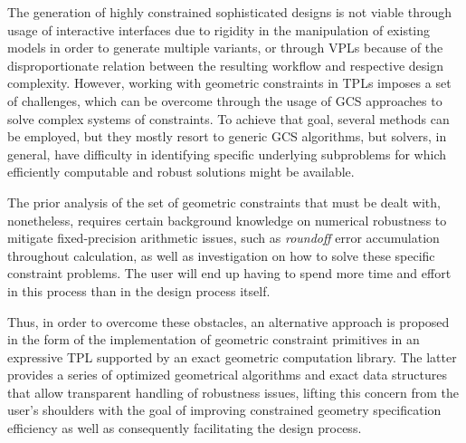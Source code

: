 %
\label{chap:conclusion}
\cleardoublepage{}


\noindent
The generation of highly constrained sophisticated designs is not viable through
usage of interactive interfaces due to rigidity in the manipulation of existing
models in order to generate multiple variants, or through \acp{VPL} because of
the disproportionate relation between the resulting workflow and respective
design complexity.  However, working with geometric constraints in \acp{TPL}
imposes a set of challenges, which can be overcome through the usage of \ac{GCS}
approaches to solve complex systems of constraints.  To achieve that goal,
several methods can be employed, but they mostly resort to generic \acs{GCS}
algorithms, but solvers, in general, have difficulty in identifying specific
underlying subproblems for which efficiently computable and robust solutions
might be available.

The prior analysis of the set of geometric constraints that must be dealt with,
nonetheless, requires certain background knowledge on numerical robustness to
mitigate fixed-precision arithmetic issues, such as \textit{roundoff} error
accumulation throughout calculation, as well as investigation on how to solve
these specific constraint problems.  The user will end up having to spend more
time and effort in this process than in the design process itself.

Thus, in order to overcome these obstacles, an alternative approach is proposed
in the form of the implementation of geometric constraint primitives in an
expressive \ac{TPL} supported by an exact geometric computation library.  The
latter provides a series of optimized geometrical algorithms and exact data
structures that allow transparent handling of robustness issues, lifting this
concern from the user's shoulders with the goal of improving constrained
geometry specification efficiency as well as consequently facilitating the
design process.
